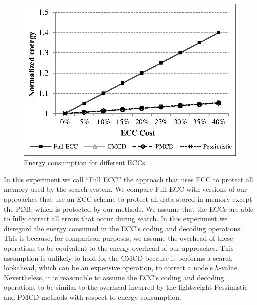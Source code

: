 \documentclass[letterpaper]{article}
\begin{document}
\begin{figure}[!htb]
\centering
\includegraphics[scale=.9]{figures/ecc_chart.eps}
\caption{Energy consumption for different ECCs.}
\label{fig:ecc}
\end{figure}

In this experiment we call ``Full ECC'' the approach that uses ECC to protect all memory used by the search system. We compare Full ECC with versions of our approaches that use an ECC scheme to protect all data stored in memory except the PDB, which is protected by our methods. We assume that the ECCs are able to fully correct all errors that occur during search. In this experiment we disregard the energy consumed in the ECC's coding and decoding operations. This is because, for comparison purposes, we assume the overhead of these operations to be equivalent to the energy
overhead of our approaches. This assumption is unlikely to hold for the CMCD because it performs a search lookahead, which can be an expensive operation, to correct a node's $h$-value. Nevertheless, it is reasonable to assume the ECC's coding and decoding operations to be similar to the overhead incurred by the lightweight Pessimistic and PMCD methods with respect to energy consumption.

\end{document}

